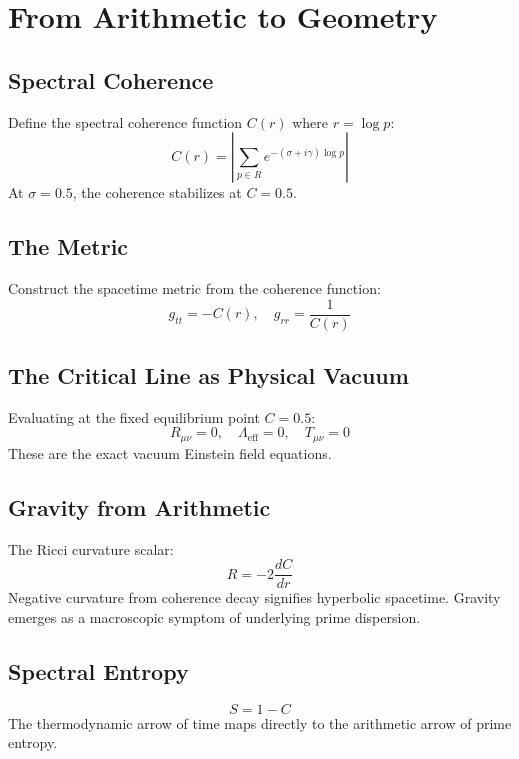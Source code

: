 \documentclass[12pt,a4paper]{article}
\begin{document}
\section{From Arithmetic to Geometry}

\subsection{Spectral Coherence}
Define the spectral coherence function $C(r)$ where $r = \log p$:
\begin{equation}
C(r) = \left| \sum_{p \in R} e^{-(\sigma + i\gamma) \log p} \right|
\label{eq:coherence}
\end{equation}
At $\sigma = 0.5$, the coherence stabilizes at $C = 0.5$.

\subsection{The Metric}
Construct the spacetime metric from the coherence function:
\begin{equation}
g_{tt} = -C(r), \quad g_{rr} = \frac{1}{C(r)}
\label{eq:metric}
\end{equation}

\subsection{The Critical Line as Physical Vacuum}
Evaluating at the fixed equilibrium point $C = 0.5$:
\begin{equation}
R_{\mu\nu} = 0, \quad \Lambda_{\text{eff}} = 0, \quad T_{\mu\nu} = 0
\label{eq:vacuum}
\end{equation}
These are the exact vacuum Einstein field equations.

\subsection{Gravity from Arithmetic}
The Ricci curvature scalar:
\begin{equation}
R = -2\frac{dC}{dr}
\label{eq:ricci}
\end{equation}
Negative curvature from coherence decay signifies hyperbolic spacetime. Gravity emerges as a macroscopic symptom of underlying prime dispersion.

\subsection{Spectral Entropy}
\begin{equation}
S = 1 - C
\label{eq:entropy}
\end{equation}
The thermodynamic arrow of time maps directly to the arithmetic arrow of prime entropy.
\end{document}
